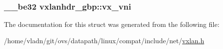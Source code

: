 \subsubsection[{vx\+\_\+vni}]{\setlength{\rightskip}{0pt plus 5cm}\+\_\+\+\_\+be32 vxlanhdr\+\_\+gbp\+::vx\+\_\+vni}\label{structvxlanhdr__gbp_aa6c706970acf2d5ffa86f76e7bad0b7a}


The documentation for this struct was generated from the following file\+:\begin{DoxyCompactItemize}
\item 
/home/vladn/git/ovs/datapath/linux/compat/include/net/\hyperlink{vxlan_8h}{vxlan.\+h}\end{DoxyCompactItemize}
